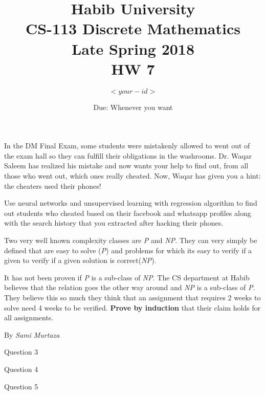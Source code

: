 \documentclass[addpoints]{exam}
\title{Habib University\\CS-113 Discrete Mathematics\\Late Spring 2018\\HW 7}
\author{$<your-id>$}  %
\date{Due: Whenever you want}
\begin{document}
\maketitle

\begin{questions}



\question
In the DM Final Exam, some students were mistakenly allowed to went out of the exam hall so they can fulfill their obligations in the washrooms. Dr. Waqar Saleem has realized his mistake and now wants your help to find out, from all those who went out, which ones really cheated. Now, Waqar has given you a hint: the cheaters used their phones! 

Use neural networks and unsupervised learning with regression algorithm to find out students who cheated based on their facebook and whatsapp profiles along with the search history that you extracted after hacking their phones.
  \begin{solution}
    
  \end{solution}

\question 
Two very well known complexity classes are \textit{P} and \textit{NP}. They can very simply be defined that are easy to solve (\textit{P}) and problems for which its easy to verify if a given to verify if a given solution is correct(\textit{NP}).

It has not been proven if \textit{P} is a sub-class of \textit{NP}. The CS department at Habib believes that the relation goes the other way around and \textit{NP} is a sub-class of \textit{P}. They believe this so much they think that an assignment that requires 2 weeks to solve need 4 weeks to be verified. \textbf{Prove by induction} that their claim holds for all assignments.


By \textit{Sami Murtaza}


  \begin{solution}
	
  \end{solution}
  
\question 
Question 3

  \begin{solution}
  
  \end{solution}

\question
Question 4

  \begin{solution}
			
  \end{solution}

\question 
Question 5

	\begin{solution}
	\end{solution}


\end{questions}
\end{document}
